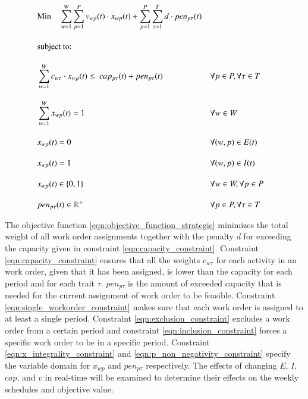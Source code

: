 \documentclass[preprint,12pt,authoryear]{elsarticle}
\begin{document}
\begin{alignat}{2}
	& \text{Min} \quad \sum_{w = 1}^{W} \sum_{p = 1}^{P} v_{wp}(t) \cdot x_{wp}(t) + \sum_{p = 1}^{P} \sum_{\tau = 1}^T d \cdot pen_{p\tau}(t)   \label{eqn:objective_function_strategic} \\[1em]
    & \text{subject to:} \notag                                                                                                                                        \\[1em]
	& \sum_{w = 1}^W c_{w\tau} \cdot x_{wp}(t) \leq \ cap_{p\tau}(t) + pen_{p\tau}(t)        && \forall p \in P, \forall \tau \in T                      \label{eqn:capacity_constraint}          \\[1em]
	& \sum_{w = 1}^{W} x_{wp}(t) = 1                                            && \forall w \in W                                       \label{eqn:single_workorder_constraint}  \\[1em]
	& x_{wp}(t) = 0                                                             && \forall (w, p) \in E(t)                               \label{eqn:exclusion_constraint}         \\[1em]
	& x_{wp}(t) = 1                                                             && \forall (w, p) \in I(t)                               \label{eqn:inclusion_constraint}         \\[1em]
	& x_{wp}(t) \in \{0, 1\}                                                    && \forall w \in W, \forall p \in P                      \label{eqn:x_integrality_constraint}     \\[1em] 
	& pen_{p\tau}(t) \in \mathbb{R}^{+}                                         && \forall p \in P, \forall \tau \in T                      \label{eqn:p_non_negativity_constraint}
\end{alignat}

The objective function \eqref{eqn:objective_function_strategic} minimizes the total weight of all work order assignments together with the penalty $d$ for exceeding the capacity given in constraint \eqref{eqn:capacity_constraint}. Constraint \eqref{eqn:capacity_constraint} ensures that all the weights $c_{w\tau}$ for each activity in an work order, given that it has been assigned, is lower than the capacity for each period and for each trait $\tau$. $pen_{p\tau}$ is the amount of exceeded capacity that is needed for the current assignment of work order to be feasible. Constraint \eqref{eqn:single_workorder_constraint} makes sure that each work order is assigned to at least a single period. Constraint \eqref{eqn:exclusion_constraint} excludes a work order from a certain period and constraint \eqref{eqn:inclusion_constraint} forces a specific work order to be in a specific period. Constraint \eqref{eqn:x_integrality_constraint} and \eqref{eqn:p_non_negativity_constraint} specify the variable domain for $x_{wp}$ and $pen_{p\tau}$ respectively. The effects of changing $E$, $I$, $cap$, and $v$ in real-time will be examined to determine their effects on the weekly schedules and objective value.
\end{document}

